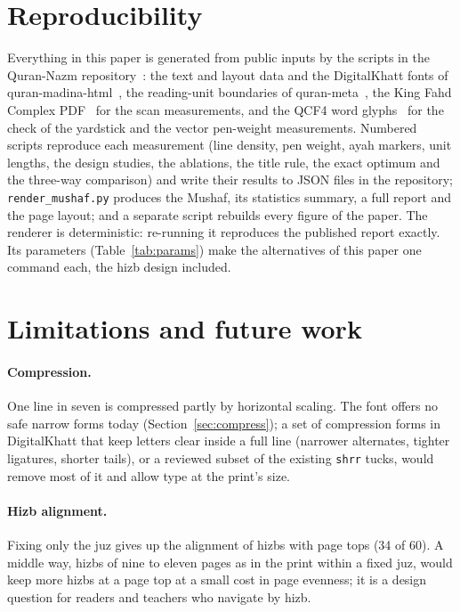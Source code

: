 \documentclass[sigconf,nonacm]{acmart}
\begin{document}
\section{Reproducibility}\label{sec:repro}
Everything in this paper is generated from public inputs by the scripts in the Quran-Nazm repository~\cite{nazm}: the text and layout data and the DigitalKhatt fonts of quran-madina-html~\cite{qmh}, the reading-unit boundaries of quran-meta~\cite{quranmeta}, the King Fahd Complex PDF~\cite{scan} for the scan measurements, and the QCF4 word glyphs~\cite{qcf4} for the check of the yardstick and the vector pen-weight measurements. Numbered scripts reproduce each measurement (line density, pen weight, ayah markers, unit lengths, the design studies, the ablations, the title rule, the exact optimum and the three-way comparison) and write their results to JSON files in the repository; \texttt{render\_mushaf.py} produces the Mushaf, its statistics summary, a full report and the page layout; and a separate script rebuilds every figure of the paper. The renderer is deterministic: re-running it reproduces the published report exactly. Its parameters (Table~\ref{tab:params}) make the alternatives of this paper one command each, the hizb design included.

\section{Limitations and future work}\label{sec:limits}
\paragraph{Compression.} One line in seven is compressed partly by horizontal scaling. The font offers no safe narrow forms today (Section~\ref{sec:compress}); a set of compression forms in DigitalKhatt that keep letters clear inside a full line (narrower alternates, tighter ligatures, shorter tails), or a reviewed subset of the existing \texttt{shrr} tucks, would remove most of it and allow type at the print's size.

\paragraph{Hizb alignment.} Fixing only the juz gives up the alignment of hizbs with page tops (34 of 60). A middle way, hizbs of nine to eleven pages as in the print within a fixed juz, would keep more hizbs at a page top at a small cost in page evenness; it is a design question for readers and teachers who navigate by hizb.
\end{document}
